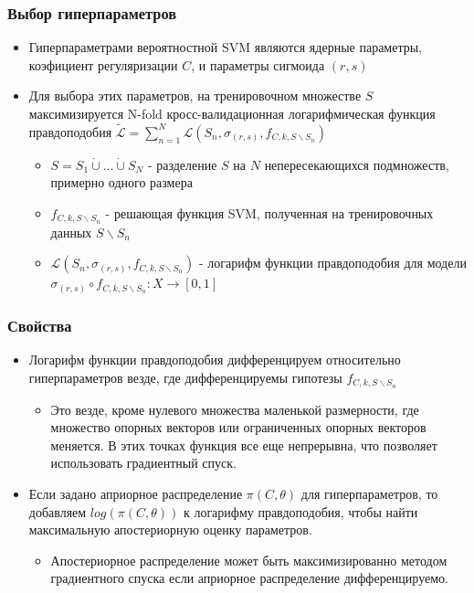 \documentclass{beamer}
\begin{document}
\begin{frame}
	\frametitle{Выбор гиперпараметров}

	\begin{itemize}
		\item Гиперпараметрами вероятностной SVM являются ядерные параметры,
		      коэфициент регуляризации $C$, и параметры сигмоида $(r,s)$

		\item Для выбора этих параметров, на тренировочном множестве $S$
		      максимизируется N-fold кросс-валидационная логарифмическая функция
		      правдоподобия
		      $\mathcal{\tilde{L}} =
			      \sum_{n=1}^{N} \mathcal{L}(S_n, \sigma_{(r,s)}, f_{C,k,S \backslash S_n})$

		      \begin{itemize}
			      \item $S = S_1 \dot{\cup} ... \dot{\cup}S_N$ - разделение $S$ на
			            $N$ непересекающихся подмножеств, примерно одного размера
			      \item $f_{C,k, S \backslash S_n}$ - решающая функция SVM,
			            полученная на тренировочных данных $S \backslash S_n$
			      \item $\mathcal{L}(S_n, \sigma_{(r,s)}, f_{C,k,S \backslash S_n})$ -
			            логарифм функции правдоподобия для модели $\sigma_{(r, s)}
				            \circ f_{C, k, S \backslash S_n}: X \rightarrow [0, 1] $

		      \end{itemize}
	\end{itemize}
\end{frame}

\begin{frame}
	\frametitle{Свойства}

	\begin{itemize}
		\item Логарифм функции правдоподобия дифференцируем относительно
		      гиперпараметров везде, где дифференцируемы гипотезы
		      $f_{C, k, S \backslash S_n}$

		      \begin{itemize}
			      \item Это везде, кроме нулевого множества маленькой размерности, где
			            множество опорных векторов или ограниченных опорных векторов
			            меняется. В этих точках функция все еще непрерывна, что
			            позволяет использовать градиентный спуск.
		      \end{itemize}
		\item Если задано априорное распределение $\pi(C, \theta)$ для
		      гиперпараметров, то добавляем $log(\pi(C, \theta))$ к логарифму
		      правдоподобия, чтобы найти максимальную апостериорную оценку
		      параметров.
		      \begin{itemize}
			      \item Апостериорное распределение может быть максимизированно
			            методом градиентного спуска если априорное распределение
			            дифференцируемо.
		      \end{itemize}
	\end{itemize}
\end{frame}
\end{document}
